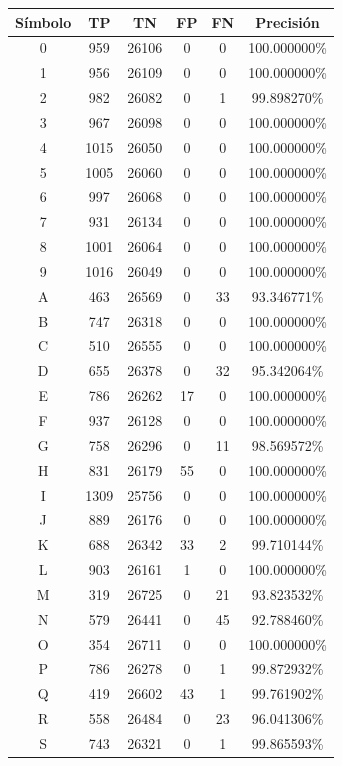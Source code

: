 \documentclass[a4paper, 11pt, oneside]{report}
\begin{document}
\begin{table}
\centering
\begin{tabular}{|c|c|c|c|c|c|}
	\hline
	Símbolo & TP & TN & FP & FN & Precisión \\ 
	\hline
	0 & 959 & 26106 & 0 & 0 & 100.000000\% \\ 
	1 & 956 & 26109 & 0 & 0 & 100.000000\% \\ 
	2 & 982 & 26082 & 0 & 1 & 99.898270\% \\ 
	3 & 967 & 26098 & 0 & 0 & 100.000000\% \\ 
	4 & 1015 & 26050 & 0 & 0 & 100.000000\% \\ 
	5 & 1005 & 26060 & 0 & 0 & 100.000000\% \\ 
	6 & 997 & 26068 & 0 & 0 & 100.000000\% \\ 
	7 & 931 & 26134 & 0 & 0 & 100.000000\% \\ 
	8 & 1001 & 26064 & 0 & 0 & 100.000000\% \\ 
	9 & 1016 & 26049 & 0 & 0 & 100.000000\% \\ 
	A & 463 & 26569 & 0 & 33 & 93.346771\% \\ 
	B & 747 & 26318 & 0 & 0 & 100.000000\% \\ 
	C & 510 & 26555 & 0 & 0 & 100.000000\% \\ 
	D & 655 & 26378 & 0 & 32 & 95.342064\% \\ 
	E & 786 & 26262 & 17 & 0 & 100.000000\% \\ 
	F & 937 & 26128 & 0 & 0 & 100.000000\% \\ 
	G & 758 & 26296 & 0 & 11 & 98.569572\% \\ 
	H & 831 & 26179 & 55 & 0 & 100.000000\% \\ 
	I & 1309 & 25756 & 0 & 0 & 100.000000\% \\ 
	J & 889 & 26176 & 0 & 0 & 100.000000\% \\ 
	K & 688 & 26342 & 33 & 2 & 99.710144\% \\ 
	L & 903 & 26161 & 1 & 0 & 100.000000\% \\ 
	M & 319 & 26725 & 0 & 21 & 93.823532\% \\ 
	N & 579 & 26441 & 0 & 45 & 92.788460\% \\ 
	O & 354 & 26711 & 0 & 0 & 100.000000\% \\ 
	P & 786 & 26278 & 0 & 1 & 99.872932\% \\ 
	Q & 419 & 26602 & 43 & 1 & 99.761902\% \\ 
	R & 558 & 26484 & 0 & 23 & 96.041306\% \\ 
	S & 743 & 26321 & 0 & 1 & 99.865593\% \\ 

\end{tabular}
\end{table}
\end{document}
